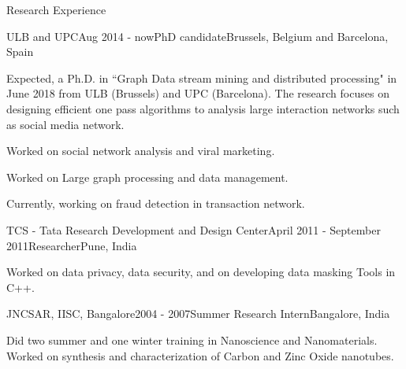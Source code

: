 \documentclass{resume} %
\begin{document}
\begin{rSection}{Research Experience}
\begin{rSubsection}{ULB and UPC}{Aug 2014 - now}{PhD candidate}{Brussels, Belgium and Barcelona, Spain}
 \item Expected, a Ph.D. in ``Graph Data stream mining and distributed processing" in June 2018 from ULB (Brussels) and UPC (Barcelona). The research focuses on designing efficient one pass algorithms to analysis large interaction networks such as social media network.
 \item Worked on social network analysis and viral marketing.
 \item Worked on Large graph processing and data management.
 \item Currently, working on fraud detection in transaction network.
\end{rSubsection}
\begin{rSubsection}{TCS - Tata Research Development and Design Center}{April 2011 - September 2011}{Researcher}{Pune, India}
\item Worked on data privacy, data security, and on developing data masking Tools in C++.
\end{rSubsection}

\begin{rSubsection}{JNCSAR, IISC, Bangalore}{2004 - 2007}{Summer Research Intern}{Bangalore, India}
\item Did two summer and one winter training in Nanoscience and Nanomaterials. Worked on synthesis and characterization of Carbon and Zinc Oxide nanotubes.
\end{rSubsection}
\end{rSection}

\end{document}
